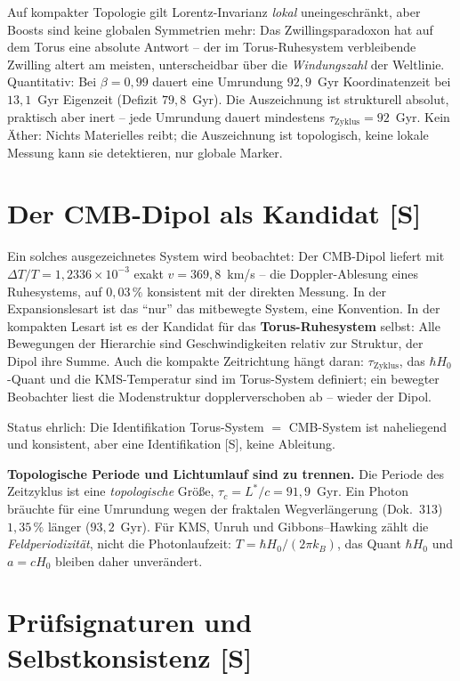 \documentclass[11pt]{report}
\begin{document}
Auf kompakter Topologie gilt Lorentz-Invarianz \emph{lokal}
uneingeschränkt, aber Boosts sind keine globalen Symmetrien mehr:
Das Zwillingsparadoxon hat auf dem Torus eine absolute Antwort --
der im Torus-Ruhesystem verbleibende Zwilling altert am meisten,
unterscheidbar über die \emph{Windungszahl} der Weltlinie.
Quantitativ: Bei $\beta = 0{,}99$ dauert eine Umrundung
$92{,}9$~Gyr Koordinatenzeit bei $13{,}1$~Gyr Eigenzeit
(Defizit $79{,}8$~Gyr). Die Auszeichnung ist strukturell absolut,
praktisch aber inert -- jede Umrundung dauert mindestens
$\tau_\text{Zyklus} = 92$~Gyr. Kein Äther: Nichts Materielles
reibt; die Auszeichnung ist topologisch, keine lokale Messung kann
sie detektieren, nur globale Marker.

\section{Der CMB-Dipol als Kandidat [S]}

Ein solches ausgezeichnetes System wird beobachtet: Der CMB-Dipol
liefert mit $\Delta T/T = 1{,}2336\times10^{-3}$ exakt
$v = 369{,}8$~km/s -- die Doppler-Ablesung eines Ruhesystems, auf
$0{,}03\,\%$ konsistent mit der direkten Messung. In der
Expansionslesart ist das \enquote{nur} das mitbewegte System, eine
Konvention. In der kompakten Lesart ist es der Kandidat für das
\textbf{Torus-Ruhesystem} selbst: Alle Bewegungen der Hierarchie
sind Geschwindigkeiten relativ zur Struktur, der Dipol ihre Summe.
Auch die kompakte Zeitrichtung hängt daran: $\tau_\text{Zyklus}$,
das $\hbar H_0$-Quant und die KMS-Temperatur sind im Torus-System
definiert; ein bewegter Beobachter liest die Modenstruktur
dopplerverschoben ab -- wieder der Dipol.

Status ehrlich: Die Identifikation Torus-System $=$ CMB-System ist
naheliegend und konsistent, aber eine Identifikation [S], keine
Ableitung.

\textbf{Topologische Periode und Lichtumlauf sind zu trennen.}
Die Periode des Zeitzyklus ist eine \emph{topologische} Größe,
$\tau_c = L^{*}/c = 91{,}9$~Gyr. Ein Photon bräuchte für eine
Umrundung wegen der fraktalen Wegverlängerung (Dok.~313)
$1{,}35\,\%$ länger ($93{,}2$~Gyr). Für KMS, Unruh und
Gibbons--Hawking zählt die \emph{Feldperiodizität}, nicht die
Photonlaufzeit: $T = \hbar H_0/(2\pi k_B)$, das Quant
$\hbar H_0$ und $a = cH_0$ bleiben daher unverändert.

\section{Prüfsignaturen und Selbstkonsistenz [S]}
\end{document}
